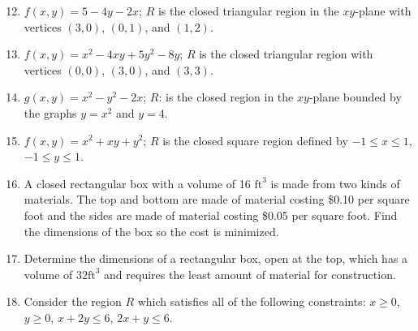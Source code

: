 \documentclass[12pt]{article}
\newif\ifans
\begin{document}
\begin{enumerate}
\setcounter{enumi}{11}

\item $f(x,y)=5-4y-2x$; $R$ is the closed triangular region in the $xy$-plane with vertices $(3,0)$, $(0,1)$, and $(1,2)$. 

\ifans{\fbox{Absolute minimum of $-5$ at $(1,2)$; Absolute maximum of $1$ at $(0,1)$}} \fi

\item $f(x,y)=x^2-4xy+5y^2-8y$; $R$ is the closed triangular region with vertices $(0,0)$, $(3,0)$, and $(3,3)$.

\ifans{\fbox{Absolute minimum of $-11$ at $(3,2)$; Absolute maximum of 9 at $(3,0)$}} \fi

\item $g(x,y)=x^2-y^2-2x$; $R$: is the closed region in the $xy$-plane bounded by the graphs $y=x^2$ and $y=4$. 

\ifans{\fbox{Absolute minimum of $-17$ at $(1,4)$; Absolute maximum of $2$ at $(-1,1)$}} \fi

\item $f(x,y)=x^2+xy+y^2$; $R$ is the closed square region defined by $-1 \leq x \leq 1$, $-1 \leq y \leq 1$.

\ifans{\fbox{Absolute minimum of 0 at $(0,0)$; Absolute maximum of 3 at $(1,1)$ and $(-1,-1)$}} \fi

\item A closed rectangular box with a volume of 16 $\text{ft}^3$ is made from two kinds of materials.  The top and bottom are made of material costing \$0.10 per square foot and the sides are made of material costing \$0.05 per square foot.  Find the dimensions of the box so the cost is minimized.

\ifans{\fbox{$2\text{ft} \times 2\text{ft} \times 4\text{ft}$}} \fi

\item Determine the dimensions of a rectangular box, open at the top, which has  a volume of $32 \text{ft}^3$ and requires the least amount of material for construction.

\ifans{\fbox{$4 \text{ft}\times 4\text{ft} \times 2 \text{ft}$}} \fi

\item Consider the region $R$ which satisfies all of the following constraints: $x \geq 0$, $y \geq 0$, $x+2y \leq 6$, $2x+y\leq 6$.

\begin{enumerate}


\end{enumerate}
\end{enumerate}
\end{document}
